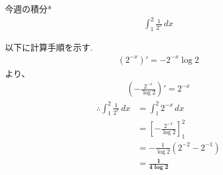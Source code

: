 \documentclass[main]{subfiles}
\begin{document}

\begin{mondai}{4}{今週の積分}{*}
    \begin{align*}
        \int_1^2 \frac{1}{2^x} \, dx
    \end{align*}
\end{mondai}


\solutionhead
\hfill
以下に計算手順を示す.
\hfill\
\begin{align*}
    \left(2^{-x}\right)'=-2^{-x}\log 2
\end{align*}
より、
\begin{align*}
    \left(-\frac{2^{-x}}{\log 2}\right)'=2^{-x}
\end{align*}
\begin{align*}
    \therefore \int_1^2 \frac{1}{2^x} \, dx
        &= \int_1^2 2^{-x} \, dx \\
        &= \left[ -\frac{2^{-x}}{\log 2}\right]_1^2 \\
        &= -\frac{1}{\log 2} \left(2^{-2}-2^{-1}\right) \\
        &= \boldsymbol{\frac{1}{4\log 2}}
\end{align*}
\end{document}
